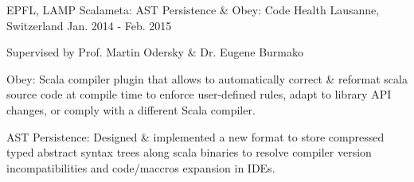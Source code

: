 \begin{cventries}
\cventry
{EPFL, LAMP}
{Scalameta: AST Persistence \& Obey: Code Health}
{Lausanne, Switzerland}
{Jan. 2014 - Feb. 2015}
{
	\begin{cvitems}
	\item{Supervised by Prof. Martin Odersky \& Dr. Eugene Burmako}
	\item{Obey: Scala compiler plugin that allows to automatically correct \& reformat scala source code at compile time to enforce user-defined rules, adapt to library API changes, or comply with a different Scala compiler.}
	\item{AST Persistence: Designed \& implemented a new format to store compressed typed abstract syntax trees along scala binaries to resolve compiler version incompatibilities and code/maccros expansion in IDEs.}
	\end{cvitems}
}

\end{cventries}